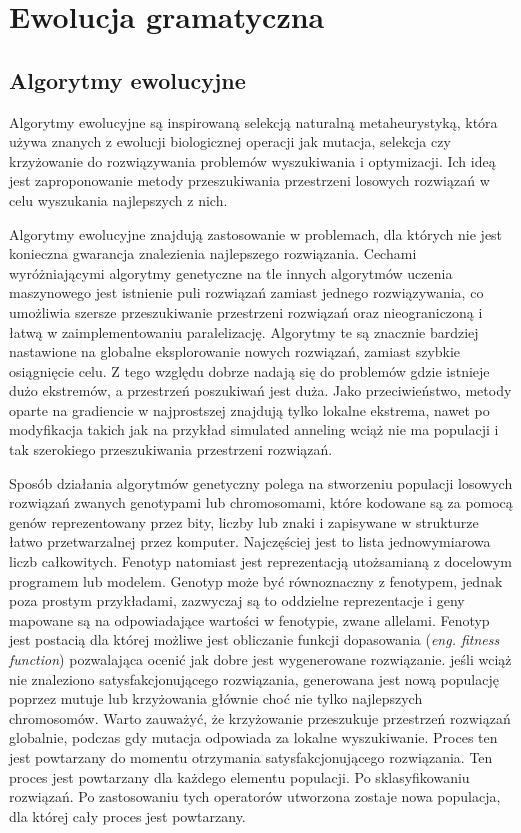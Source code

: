 
\section{Ewolucja gramatyczna}
\label{sec:ewolucjaGramatyczna}
\subsection{Algorytmy ewolucyjne}
Algorytmy ewolucyjne \cite{EA} są inspirowaną selekcją naturalną metaheurystyką, która używa znanych z ewolucji biologicznej operacji jak mutacja, selekcja czy krzyżowanie do rozwiązywania problemów wyszukiwania i optymizacji. Ich ideą jest zaproponowanie metody przeszukiwania przestrzeni losowych rozwiązań w celu wyszukania najlepszych z nich. 

Algorytmy ewolucyjne znajdują zastosowanie w problemach, dla których nie jest konieczna gwarancja znalezienia najlepszego rozwiązania. Cechami wyróżniającymi algorytmy genetyczne na tle innych algorytmów uczenia maszynowego jest istnienie puli rozwiązań zamiast jednego rozwiązywania, co umożliwia szersze przeszukiwanie przestrzeni rozwiązań oraz nieograniczoną i łatwą w zaimplementowaniu paralelizację. Algorytmy te są znacznie bardziej nastawione na globalne eksplorowanie nowych rozwiązań, zamiast szybkie osiągnięcie celu. Z tego względu dobrze nadają się do problemów gdzie istnieje dużo ekstremów, a przestrzeń poszukiwań jest duża. Jako przeciwieństwo, metody oparte na gradiencie w najprostszej znajdują tylko lokalne ekstrema, nawet po modyfikacja takich jak na przykład simulated anneling wciąż nie ma populacji i tak szerokiego przeszukiwania przestrzeni rozwiązań.

Sposób działania algorytmów genetyczny polega na stworzeniu populacji losowych rozwiązań zwanych genotypami lub chromosomami, które kodowane są za pomocą genów reprezentowany przez bity, liczby lub znaki i zapisywane w strukturze łatwo przetwarzalnej przez komputer. Najczęściej jest to lista jednowymiarowa liczb całkowitych. Fenotyp natomiast jest reprezentacją utożsamianą z docelowym programem lub modelem. Genotyp może być równoznaczny z fenotypem, jednak poza prostym przykładami, zazwyczaj są to oddzielne reprezentacje i geny mapowane są na odpowiadające wartości w fenotypie, zwane allelami. Fenotyp jest postacią dla której możliwe jest obliczanie funkcji dopasowania (\textit{eng. fitness function}) pozwalająca ocenić jak dobre jest wygenerowane rozwiązanie. jeśli wciąż nie znaleziono satysfakcjonującego rozwiązania, generowana jest nową populację poprzez mutuje lub krzyżowania głównie choć nie tylko najlepszych chromosomów. Warto zauważyć, że krzyżowanie przeszukuje przestrzeń rozwiązań globalnie, podczas gdy mutacja odpowiada za lokalne wyszukiwanie. Proces ten jest powtarzany do momentu otrzymania satysfakcjonującego rozwiązania. Ten proces jest powtarzany dla każdego elementu populacji. Po sklasyfikowaniu rozwiązań. Po zastosowaniu tych operatorów utworzona zostaje nowa populacja, dla której cały proces jest powtarzany.   

